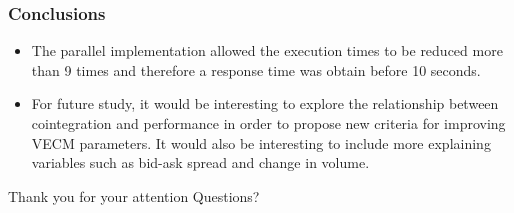 \documentclass[compress,red]{beamer}
\begin{document}
\begin{frame}
\frametitle{Conclusions}
\begin{itemize}
\item The parallel implementation allowed the execution times to be reduced
more than 9 times and therefore a response time was obtain before 10
seconds. 
\item For future study, it would be interesting to explore the relationship between
cointegration and performance in order to propose new criteria for
improving VECM parameters. It would also be interesting to include more 
explaining variables such as bid-ask spread and change in volume.
\end{itemize}
\end{frame}

\begin{frame}[plain,c]
\begin{center}
\Huge Thank you for your attention
\Huge Questions?
\end{center}
\end{frame}
\end{document}
